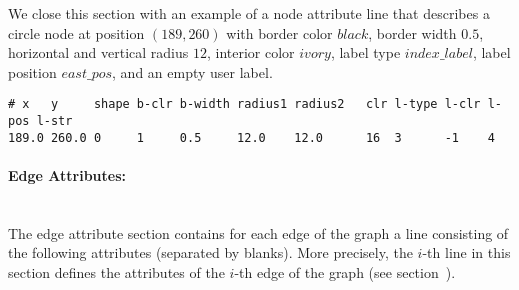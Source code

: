 We close this section with an example of a node attribute line
that describes a circle node at position $(189,260)$ with
border color $black$, border width $0.5$, horizontal and
vertical radius $12$, interior color $ivory$, label type
$index\_label$, label position $east\_pos$, and
an empty user label.
\begin{verbatim}
# x   y     shape b-clr b-width radius1 radius2   clr l-type l-clr l-pos l-str
189.0 260.0 0     1     0.5     12.0    12.0      16  3      -1    4
\end{verbatim}





\paragraph{Edge Attributes:}\ \\

The edge attribute section contains for each edge of the graph
a line consisting of the following attributes (separated by blanks).
More precisely, the $i$-th line in this section defines the attributes
of the $i$-th edge of the graph (see section~).

